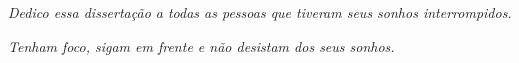 
\centerline{\textit{Dedico essa dissertação a todas as pessoas que tiveram seus sonhos interrompidos.}}
\centerline{\textit{Tenham foco, sigam em frente e não desistam dos seus sonhos.}}